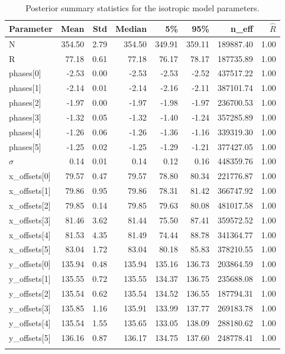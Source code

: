 \documentclass[a4paper,12pt]{article}
\begin{document}
\begin{longtable}{lrrrrrrr}
    \toprule
    \textbf{Parameter} & \textbf{Mean} & \textbf{Std} & \textbf{Median} & \textbf{5\%} & \textbf{95\%} & \textbf{n\_eff} & \textbf{$\hat{R}$} \\
    \midrule
    N              & 354.50 & 2.79 & 354.50 & 349.91 & 359.11 & 189887.40 & 1.00 \\
    R              & 77.18 & 0.61 & 77.18 & 76.17 & 78.17 & 187735.89 & 1.00 \\
    phases[0]      & -2.53 & 0.00 & -2.53 & -2.53 & -2.52 & 437517.22 & 1.00 \\
    phases[1]      & -2.14 & 0.01 & -2.14 & -2.16 & -2.11 & 387101.74 & 1.00 \\
    phases[2]      & -1.97 & 0.00 & -1.97 & -1.98 & -1.97 & 236700.53 & 1.00 \\
    phases[3]      & -1.32 & 0.05 & -1.32 & -1.40 & -1.24 & 357285.89 & 1.00 \\
    phases[4]      & -1.26 & 0.06 & -1.26 & -1.36 & -1.16 & 339319.30 & 1.00 \\
    phases[5]      & -1.25 & 0.02 & -1.25 & -1.29 & -1.21 & 377427.05 & 1.00 \\
    $\sigma$       & 0.14 & 0.01 & 0.14 & 0.12 & 0.16 & 448359.76 & 1.00 \\
    x\_offsets[0]  & 79.57 & 0.47 & 79.57 & 78.80 & 80.34 & 221776.87 & 1.00 \\
    x\_offsets[1]  & 79.86 & 0.95 & 79.86 & 78.31 & 81.42 & 366747.92 & 1.00 \\
    x\_offsets[2]  & 79.85 & 0.14 & 79.85 & 79.63 & 80.08 & 481017.58 & 1.00 \\
    x\_offsets[3]  & 81.46 & 3.62 & 81.44 & 75.50 & 87.41 & 359572.52 & 1.00 \\
    x\_offsets[4]  & 81.53 & 4.35 & 81.49 & 74.44 & 88.78 & 341364.77 & 1.00 \\
    x\_offsets[5]  & 83.04 & 1.72 & 83.04 & 80.18 & 85.83 & 378210.55 & 1.00 \\
    y\_offsets[0]  & 135.94 & 0.48 & 135.94 & 135.16 & 136.73 & 203864.59 & 1.00 \\
    y\_offsets[1]  & 135.55 & 0.72 & 135.55 & 134.37 & 136.75 & 235688.08 & 1.00 \\
    y\_offsets[2]  & 135.54 & 0.62 & 135.54 & 134.52 & 136.55 & 187794.31 & 1.00 \\
    y\_offsets[3]  & 135.85 & 1.16 & 135.91 & 133.99 & 137.77 & 269183.78 & 1.00 \\
    y\_offsets[4]  & 135.54 & 1.55 & 135.65 & 133.05 & 138.09 & 288180.62 & 1.00 \\
    y\_offsets[5]  & 136.16 & 0.87 & 136.17 & 134.75 & 137.60 & 248778.41 & 1.00 \\
    \caption{Posterior summary statistics for the isotropic model parameters.}
    \label{tab:posterior_summary_iso}
    \end{longtable}
\end{document}
